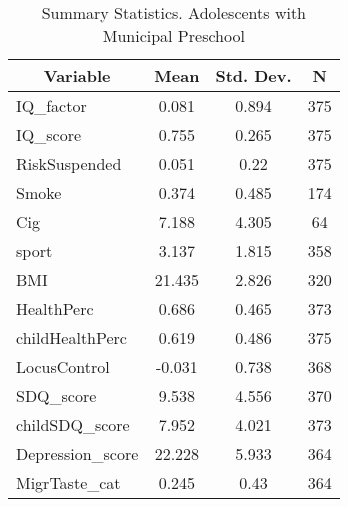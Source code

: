 
\begin{table}[htbp]\centering \caption{Summary Statistics. Adolescents with Municipal Preschool \label{schoolAdolmaternaMuni}}
\begin{tabular}{l c c  c}\hline\hline
\multicolumn{1}{c}{\textbf{Variable}} & \textbf{Mean}
 & \textbf{Std. Dev.} & \textbf{N}\\ \hline
IQ\_factor & 0.081 & 0.894  & 375\\
IQ\_score & 0.755 & 0.265  & 375\\
RiskSuspended & 0.051 & 0.22  & 375\\
Smoke & 0.374 & 0.485  & 174\\
Cig & 7.188 & 4.305  & 64\\
sport & 3.137 & 1.815  & 358\\
BMI & 21.435 & 2.826  & 320\\
HealthPerc & 0.686 & 0.465  & 373\\
childHealthPerc & 0.619 & 0.486  & 375\\
LocusControl & -0.031 & 0.738  & 368\\
SDQ\_score & 9.538 & 4.556  & 370\\
childSDQ\_score & 7.952 & 4.021  & 373\\
Depression\_score & 22.228 & 5.933  & 364\\
MigrTaste\_cat & 0.245 & 0.43  & 364\\
\hline\end{tabular}
\end{table}
